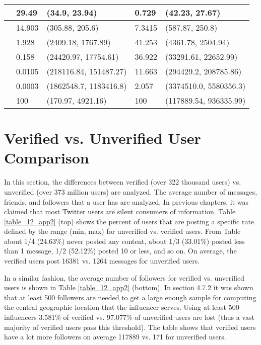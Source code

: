 \begin{table}
\begin{center}
\begin{tabular}{|l|l|l|l|l|}
\hline
[10,100] & 29.49 & (34.9, 23.94) & 0.729 & (42.23, 27.67)\\
\hline
[100,1000] & 14.903 & (305.88, 205.6) & 7.3415 & (587.87, 250.8)\\
\hline
[1000,10000] & 1.928 & (2409.18, 1767.89) & 41.253 & (4361.78, 2504.94) \\
\hline
[10000,100000] & 0.158 & (24420.97, 17754.61) & 36.922 & (33291.61, 22652.99)\\
\hline
[100000,1000000] & 0.0105 & (218116.84, 151487.27) & 11.663 & (294429.2, 208785.86)\\
\hline
[1000000,Inf] & 0.0003 & (1862548.7, 1183416.8) & 2.057 & (3374510.0, 5580356.3)\\
\hline
[0, Inf] & 100 & (170.97, 4921.16) & 100 & (117889.54, 936335.99) \\
\hline
\end{tabular}
\end{center}
\end{table}

\section{Verified vs. Unverified User Comparison}
In this section, the differences between verified (over 322 thousand users) vs. unverified (over 373 million users) are analyzed. The average number of messages, friends, and followers that a user has are analyzed. In previous chapters, it was claimed that most Twitter users are silent consumers of information. Table \ref{table_12_app2} (top) shows the percent of users that are posting a specific rate defined by the range (min, max) for unverified vs. verified users. From Table about 1/4 (24.63\%) never posted any content, about 1/3 (33.01\%) posted less than 1 message, 1/2 (52.12\%) posted 10 or less, and so on. On average, the verified users post 16381 vs. 1264 messages for unverified users. 

In a similar fashion, the average number of followers for verified vs. unverified users is shown in Table \ref{table_12_app2} (bottom). In section 4.7.2 it was shown that at least 500 followers are needed to get a large enough sample for computing the central geographic location that the influencer serves. Using at least 500 influencers 3.581\% of verified vs. 97.077\% of unverified users are lost (thus a vast majority of verified users pass this threshold). The table shows that verified users have a lot more followers on average 117889 vs. 171 for unverified users.

